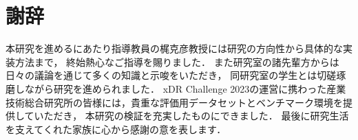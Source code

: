 \chapter*{謝辞}

本研究を進めるにあたり指導教員の梶克彦教授には研究の方向性から具体的な実装方法まで，
終始熱心なご指導を賜りました．
また研究室の諸先輩方からは日々の議論を通じて多くの知識と示唆をいただき，
同研究室の学生とは切磋琢磨しながら研究を進められました．
xDR Challenge 2023の運営に携わった産業技術総合研究所の皆様には，貴重な評価用データセットとベンチマーク環境を提供していただき，
本研究の検証を充実したものにできました．
最後に研究生活を支えてくれた家族に心から感謝の意を表します．
